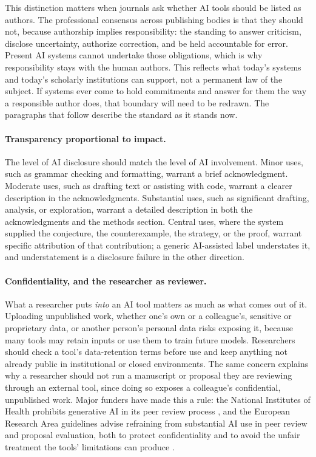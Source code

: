 \documentclass{SIAMbook2023}
\begin{document}
This distinction matters when journals ask whether AI tools should be listed as authors. The professional consensus across publishing bodies is that they should not, because authorship implies responsibility: the standing to answer criticism, disclose uncertainty, authorize correction, and be held accountable for error. Present AI systems cannot undertake those obligations, which is why responsibility stays with the human authors. This reflects what today's systems and today's scholarly institutions can support, not a permanent law of the subject. If systems ever come to hold commitments and answer for them the way a responsible author does, that boundary will need to be redrawn. The paragraphs that follow describe the standard as it stands now.

\paragraph{Transparency proportional to impact.}
The level of AI disclosure should match the level of AI involvement. Minor uses, such as grammar checking and formatting, warrant a brief acknowledgment. Moderate uses, such as drafting text or assisting with code, warrant a clearer description in the acknowledgments. Substantial uses, such as significant drafting, analysis, or exploration, warrant a detailed description in both the acknowledgments and the methods section. Central uses, where the system supplied the conjecture, the counterexample, the strategy, or the proof, warrant specific attribution of that contribution; a generic AI-assisted label understates it, and understatement is a disclosure failure in the other direction.

\paragraph{Confidentiality, and the researcher as reviewer.}
What a researcher puts \emph{into} an AI tool matters as much as what comes out of it. Uploading unpublished work, whether one's own or a colleague's, sensitive or proprietary data, or another person's personal data risks exposing it, because many tools may retain inputs or use them to train future models. Researchers should check a tool's data-retention terms before use and keep anything not already public in institutional or closed environments. The same concern explains why a researcher should not run a manuscript or proposal they are reviewing through an external tool, since doing so exposes a colleague's confidential, unpublished work. Major funders have made this a rule: the National Institutes of Health prohibits generative AI in its peer review process \citep{nih2023peer}, and the European Research Area guidelines advise refraining from substantial AI use in peer review and proposal evaluation, both to protect confidentiality and to avoid the unfair treatment the tools' limitations can produce \citep{europeancommission2026living}.
\end{document}
